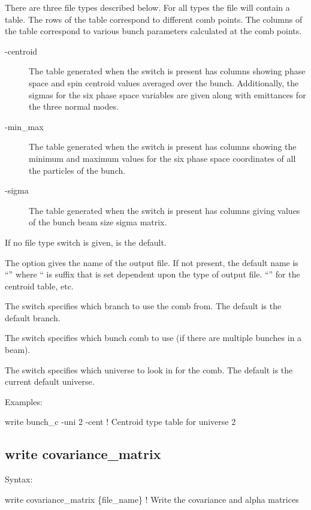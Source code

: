 {{{{{{{{{{{{There are three file types described below. For all types the file will contain a table. The rows of
the table correspond to different comb points. The columns of the table correspond to various bunch
parameters calculated at the comb points.
\begin{description}
\item[-centroid] \Newline
The table generated when the  switch is present has columns showing phase space and
spin centroid values averaged over the bunch. Additionally, the sigmas for the six phase space
variables are given along with emittances for the three normal modes.
%
\item[-min_max] \Newline
The table generated when the  switch is present has columns showing the minimum and
maximum values for the six phase space coordinates of all the particles of the bunch.
% 
\item[-sigma] \Newline 
The table generated when the  switch is present has columns giving values of the bunch
beam size sigma matrix.
\end{description}
If no file type switch is given,  is the default.

The  option gives the name of the output file. If not present, the default name is
``'' where `` is suffix that is set dependent upon the type of output
file. ``'' for the centroid table, etc.

The  switch specifies which branch to use the comb from. The default is the default
branch.

The  switch specifies which bunch comb to use (if there are multiple bunches in a beam).

The  switch specifies which universe to look in for the comb. The default is the
current default universe.

Examples:
\begin{example}
  write bunch_c -uni 2 -cent  ! Centroid type table for universe 2
\end{example}


\subsection{write covariance_matrix}
\label{s:write.covar.matrix}

Syntax:
\begin{example}
    write covariance_matrix \{file_name\}    ! Write the covariance and alpha matrices 
\end{example}

}}}}}}}}}}}}
